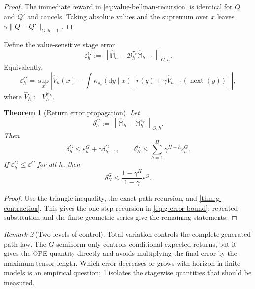\documentclass[11pt]{article}
\newtheorem{theorem}{Theorem}
\theoremstyle{definition}
\theoremstyle{remark}
\newtheorem{remark}[theorem]{Remark}
\newcommand{\nextx}{\operatorname{next}}
\newcommand{\dd}{\mathrm d}
\newcommand{\Bell}{\mathcal B}
\newcommand{\targetpi}{\pi_e}
\begin{document}
\begin{proof}
The immediate reward in \cref{eq:value-bellman-recursion} is identical for
$Q$ and $Q'$ and cancels. Taking absolute values and the supremum over $x$
leaves $\gamma\|Q-Q'\|_{G,h-1}$.
\end{proof}

Define the value-sensitive stage error
\begin{equation}
\varepsilon_h^G
:=
\left\|
\widehat{\mathbb M}_h
-
\Bell_h^{\targetpi}\widehat{\mathbb M}_{h-1}
\right\|_{G,h}.
\label{eq:g-stage-error}
\end{equation}
Equivalently,
\begin{equation}
\boxed{
\varepsilon_h^G
=
\sup_x
\left|
\widehat V_h(x)
-
\int\kappa_{\targetpi}(\dd y\mid x)
\left[
r(y)+\gamma\widehat V_{h-1}(\nextx(y))
\right]
\right|,
}
\label{eq:g-bellman-residual}
\end{equation}
where $\widehat V_h:=V_h^{\widehat{\mathbb M}_h}$.

\begin{theorem}[Return error propagation]
\label{thm:g-error}
Let
\begin{equation}
\delta_h^G
:=
\left\|
\widehat{\mathbb M}_h-\mathbb M_h^{\targetpi}
\right\|_{G,h}.
\end{equation}
Then
\begin{equation}
\boxed{
\delta_h^G
\leq
\varepsilon_h^G+\gamma\delta_{h-1}^G,
\qquad
\delta_H^G
\leq
\sum_{h=1}^{H}\gamma^{H-h}\varepsilon_h^G.
}
\label{eq:g-error-bound}
\end{equation}
If $\varepsilon_h^G\leq\varepsilon^G$ for all $h$, then
\begin{equation}
\boxed{
\delta_H^G
\leq
\frac{1-\gamma^H}{1-\gamma}\varepsilon^G.
}
\label{eq:g-uniform-bound}
\end{equation}
\end{theorem}

\begin{proof}
Use the triangle inequality, the exact path recursion, and
\cref{thm:g-contraction}. This gives the one-step recursion in
\cref{eq:g-error-bound}; repeated substitution and the finite geometric series
give the remaining statements.
\end{proof}

\begin{remark}[Two levels of control]
\label{rem:two-errors}
Total variation controls the complete generated path law. The $G$-seminorm
only controls conditional expected returns, but it gives the OPE quantity
directly and avoids multiplying the final error by the maximum tensor length.
Which error decreases or grows with horizon in finite models is an empirical
question; \cref{thm:g-error} isolates the stagewise quantities that should be
measured.
\end{remark}
\end{document}
